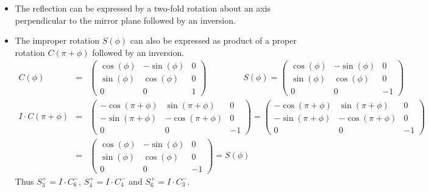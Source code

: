 \documentclass[11pt,a4paper]{report}
\begin{document}
\begin{itemize}
\item The reflection can be expressed by a two-fold rotation about an axis
perpendicular to the mirror plane followed by an inversion.
%
\item The improper rotation $S(\phi)$ can also be expressed as product of a
proper rotation $C(\pi+\phi)$ followed by an inversion.
\begin{eqnarray}
C(\phi)&=&\left(\begin{array}{ccc}
\cos(\phi)& -\sin(\phi) & 0\\
\sin(\phi)& \cos(\phi) & 0\\
0& 0& 1\end{array}\right)
\qquad\;\qquad
S(\phi)=\left(\begin{array}{ccc}
\cos(\phi)& -\sin(\phi) & 0\\
\sin(\phi)& \cos(\phi) & 0\\
0& 0& -1\end{array}\right)
\nonumber\\
I\cdot C(\pi+\phi)
&=&\left(\begin{array}{ccc}
-\cos(\pi+\phi)& \sin(\pi+\phi) & 0\\
-\sin(\pi+\phi)& -\cos(\pi+\phi) & 0\\
0& 0& -1\end{array}\right)
=\left(\begin{array}{ccc}
-\cos(\pi+\phi)& \sin(\pi+\phi) & 0\\
-\sin(\pi+\phi)& -\cos(\pi+\phi) & 0\\
0& 0& -1\end{array}\right)
\nonumber\\
&=&\left(\begin{array}{ccc}
\cos(\phi)& -\sin(\phi) & 0\\
\sin(\phi)& \cos(\phi) & 0\\
0& 0& -1\end{array}\right)
=S(\phi)
\end{eqnarray}
Thus $S_3^+=I\cdot C_6^-$, $S_4^+=I\cdot C_4^-$ and $S_6^+=I\cdot C_3^-$. 
\end{itemize}
\end{document}
